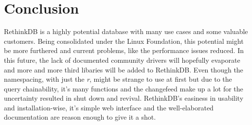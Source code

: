 \section{Conclusion}

RethinkDB is a highly potential database with many use cases and some valuable customers. Being consolidated under the Linux Foundation, this potential might be more furthered and current problems, like the performance issues reduced. In this future, the lack of documented community drivers will hopefully evaporate and more and more third libaries will be added to RethinkDB.  Even though the namespacing, with just the \textit{r}, might be strange to use at first but due to the query chainability, it's many functions and the changefeed make up a lot for the uncertainty resulted in shut down and revival. RethinkDB's easiness in usability and installation-wise, it's simple web interface and the well-elaborated documentation are reason enough to give it a shot.
